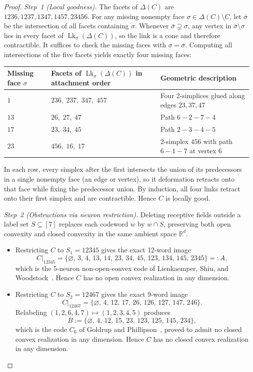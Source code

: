 \documentclass[11pt]{article}
\theoremstyle{plain}
\theoremstyle{definition}
\theoremstyle{remark}
\DeclareMathOperator{\Lk}{Lk}
\begin{document}
\begin{proof}
\emph{Step~1 (Local goodness).} The facets of $\Delta(C)$ are $1236, 1237, 1347, 1457, 23456$. For any missing nonempty face $\sigma \in \Delta(C) \setminus C$, let $\bar{\sigma}$ be the intersection of all facets containing $\sigma$. Whenever $\bar{\sigma} \supsetneq \sigma$, any vertex in $\bar{\sigma} \setminus \sigma$ lies in every facet of $\Lk_\sigma(\Delta(C))$, so the link is a cone and therefore contractible. It suffices to check the missing faces with $\sigma = \bar{\sigma}$. Computing all intersections of the five facets yields exactly four missing faces:

\begin{table}[h]\centering\small
\begin{tabular}{lll}
\toprule
Missing face $\sigma$ & Facets of $\Lk_\sigma(\Delta(C))$ in attachment order & Geometric description \\
\midrule
$1$  & $236,\; 237,\; 347,\; 457$ & Four 2-simplices glued along edges $23, 37, 47$ \\
$13$ & $26,\; 27,\; 47$           & Path $6 - 2 - 7 - 4$ \\
$17$ & $23,\; 34,\; 45$           & Path $2 - 3 - 4 - 5$ \\
$23$ & $456,\; 16,\; 17$          & 2-simplex $456$ with path $6 - 1 - 7$ at vertex $6$ \\
\bottomrule
\end{tabular}
\end{table}

In each row, every simplex after the first intersects the union of its predecessors in a single nonempty face (an edge or vertex), so it deformation retracts onto that face while fixing the predecessor union. By induction, all four links retract onto their first simplex and are contractible. Hence $C$ is locally good.

\emph{Step~2 (Obstructions via neuron restriction).} Deleting receptive fields outside a label set $S \subseteq [7]$ replaces each codeword $w$ by $w \cap S$, preserving both open convexity and closed convexity in the same ambient space $\mathbb{R}^d$.
\begin{itemize}[leftmargin=2em,itemsep=2pt]
\item Restricting $C$ to $S_1 = 12345$ gives the exact 12-word image
\[
C|_{12345} = \{\varnothing,\, 3,\, 4,\, 13,\, 14,\, 23,\, 34,\, 45,\, 123,\, 134,\, 145,\, 2345\} =: A,
\]
which is the 5-neuron non-open-convex code of Lienkaemper, Shiu, and Woodstock~\cite[Theorem~3.1]{lienkaemper2017}. Hence $C$ has no open convex realization in any dimension.
\item Restricting $C$ to $S_2 = 12467$ gives the exact 9-word image
\[
C|_{12467} = \{\varnothing,\, 4,\, 12,\, 17,\, 26,\, 126,\, 127,\, 147,\, 246\}.
\]
Relabeling $(1, 2, 6, 4, 7) \mapsto (1, 2, 3, 4, 5)$ produces
\[
B := \{\varnothing,\, 4,\, 12,\, 15,\, 23,\, 123,\, 125,\, 145,\, 234\},
\]
which is the code $C_6$ of Goldrup and Phillipson~\cite[Table~1 and Theorem~4.1]{goldrup2020}, proved to admit no closed convex realization in any dimension. Hence $C$ has no closed convex realization in any dimension.\qedhere
\end{itemize}
\end{proof}
\end{document}
